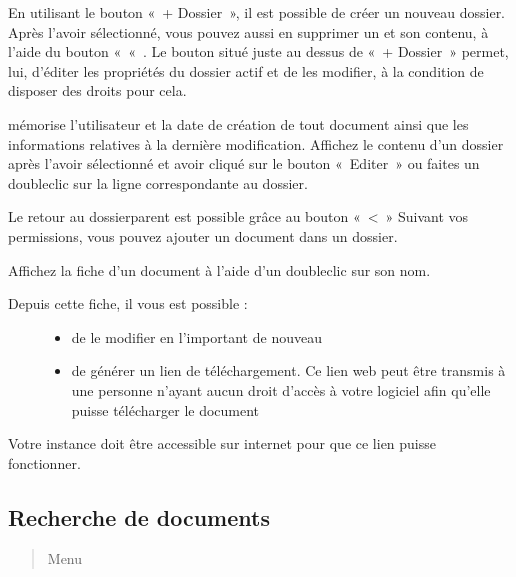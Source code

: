 \documentclass[letterpaper,10pt,french]{sphinxmanual}
\begin{document}
\noindent{}

En utilisant le bouton « + Dossier », il est possible de créer un nouveau dossier.
Après l’avoir sélectionné, vous pouvez aussi en supprimer un et son contenu, à l’aide du bouton « \sphinxhyphen{}« .
Le bouton situé juste au dessus de « + Dossier » permet, lui, d’éditer les propriétés du dossier actif et de les modifier, à la condition de disposer des droits pour cela.

 mémorise l’utilisateur et la date de création de tout document ainsi que les informations relatives à la dernière modification. Affichez le contenu d’un dossier après l’avoir sélectionné et avoir cliqué sur le bouton « Editer » ou faites un double\sphinxhyphen{}clic sur la ligne correspondante au dossier.

\noindent{}

Le retour au dossier\sphinxhyphen{}parent est possible grâce au bouton « \textless{} »
Suivant vos permissions, vous pouvez ajouter un document dans un dossier.

Affichez la fiche d’un document à l’aide d’un double\sphinxhyphen{}clic sur son nom.

\noindent{}
\begin{description}
\item[{Depuis cette fiche, il vous est possible :}] \leavevmode\begin{itemize}
\item {} 
de le modifier en l’important de nouveau

\item {} 
de générer un lien de téléchargement. Ce lien web peut être transmis à une personne n’ayant aucun droit d’accès à votre logiciel afin qu’elle puisse télécharger le document

\end{itemize}

\end{description}

 Votre instance doit être accessible sur internet pour que ce lien puisse fonctionner.


\subsection{Recherche de documents}
\label{\detokenize{documents/shared_document:recherche-de-documents}}\begin{quote}

Menu 
\end{quote}
\end{document}
